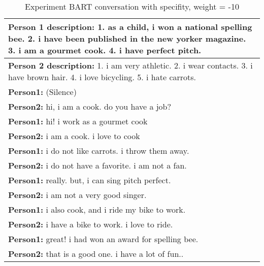 \begin{table}[H]
\centering
 \begin{tabular}{|p{14cm}|} 
 \hline
 \textbf{Person 1 description:} 1. as a child, i won a national spelling bee. 2. i have been published in the new yorker magazine. 3. i am a gourmet cook. 4. i have perfect pitch. \\
 \hline
 \textbf{Person 2 description:} 1. i am very athletic. 2. i wear contacts. 3. i have brown hair. 4. i love bicycling. 5. i hate carrots. \\
 \hline
 \textbf{Person1:} (Silence) \\
 \textbf{Person2:} hi, i am a cook. do you have a job? \\ 
 \textbf{Person1:} hi! i work as a gourmet cook \\
 \textbf{Person2:} i am a cook. i love to cook \\
 \textbf{Person1:} i do not like carrots. i throw them away. \\
 \textbf{Person2:} i do not have a favorite. i am not a fan. \\
 \textbf{Person1:} really. but, i can sing pitch perfect. \\
 \textbf{Person2:} i am not a very good singer. \\
 \textbf{Person1:} i also cook, and i ride my bike to work. \\
 \textbf{Person2:} i have a bike to work. i love to ride. \\
 \textbf{Person1:} great! i had won an award for spelling bee. \\
 \textbf{Person2:} that is a good one. i have a lot of fun.. \\
 \hline
 \end{tabular}
 \caption{Experiment BART conversation with specifity, weight = -10}
\label{tab:bart_conversation_idf-10_ap}
\end{table}


